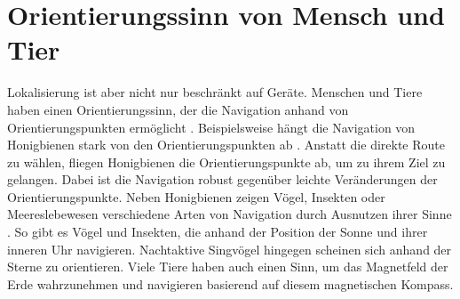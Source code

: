 \section{Orientierungssinn von Mensch und Tier}
Lokalisierung ist aber nicht nur beschränkt auf Geräte.
Menschen und Tiere haben einen Orientierungssinn, der die Navigation anhand von Orientierungspunkten ermöglicht \cite{krukar2017landmark, menzel1996knowledge}.
Beispielsweise hängt die Navigation von Honigbienen stark von den Orientierungspunkten ab \cite{menzel1996knowledge}.
Anstatt die direkte Route zu wählen, fliegen Honigbienen die Orientierungspunkte ab, um zu ihrem Ziel zu gelangen.
Dabei ist die Navigation robust gegenüber leichte Veränderungen der Orientierungspunkte.
\newline
\newline
Neben Honigbienen zeigen Vögel, Insekten oder Meereslebewesen verschiedene Arten von Navigation durch Ausnutzen ihrer Sinne \cite{aakesson2014animal}.
So gibt es Vögel und Insekten, die anhand der Position der Sonne und ihrer inneren Uhr navigieren.
Nachtaktive Singvögel hingegen scheinen sich anhand der Sterne zu orientieren.
Viele Tiere haben auch einen Sinn, um das Magnetfeld der Erde wahrzunehmen und navigieren basierend auf diesem magnetischen Kompass.